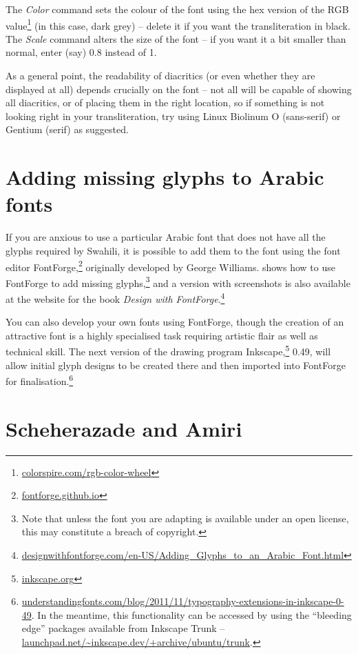 The \textit{Color} command sets the colour of the font using the hex version of the RGB value\footnote{\url{colorspire.com/rgb-color-wheel}} (in this case, dark grey) -- delete it if you want the transliteration in black.  The \textit{Scale} command alters the size of the font -- if you want it a bit smaller than normal, enter (say) 0.8 instead of 1.

As a general point, the readability of diacritics (or even whether they are displayed at all) depends crucially on the font -- not all will be capable of showing all diacritics, or of placing them in the right location, so if something is not looking right in your transliteration, try using Linux Biolinum O (sans-serif) or Gentium (serif) as suggested. 

\section{Adding missing glyphs to Arabic fonts}

If you are anxious to use a particular Arabic font that does not have all the glyphs required by Swahili, it is possible to add them to the font using the font editor FontForge,\footnote{\url{fontforge.github.io}} originally developed by George Williams.   shows how to use FontForge to add missing glyphs,\footnote{Note that unless the font you are adapting is available under an open license, this may constitute a breach of copyright.} and a version with screenshots is also available at the website for the book \textit{Design with FontForge}.\footnote{\url{designwithfontforge.com/en-US/Adding_Glyphs_to_an_Arabic_Font.html}}

You can also develop your own fonts using FontForge, though the creation of an attractive font is a highly specialised task requiring artistic flair as well as technical skill.   The next version of the drawing program Inkscape,\footnote{\url{inkscape.org}} 0.49, will allow initial glyph designs to be created there and then imported into FontForge for finalisation.\footnote{\url{understandingfonts.com/blog/2011/11/typography-extensions-in-inkscape-0-49}.  In the meantime, this functionality can be accessed by using the ``bleeding edge'' packages available from Inkscape Trunk -- \url{launchpad.net/~inkscape.dev/+archive/ubuntu/trunk}.}

\section{Scheherazade and Amiri}
\label{s:sham}

